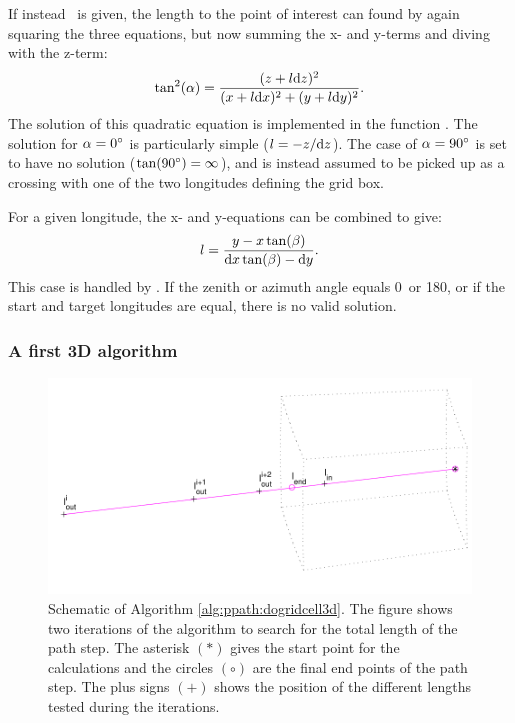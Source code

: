 If instead \Lat\ is given, the length to the point of interest can found by
again squaring the three equations, but now summing the x- and y-terms
and diving with the z-term:
\begin{equation}
  \tan^2(\alpha) = \frac{(z+l\mathrm{d} z)^2}{(x+l\mathrm{d} x)^2+(y+l\mathrm{d} y)^2}.
\end{equation}
The solution of this quadratic equation is implemented in the function
. The solution for $\alpha=0^\circ$ is particularly
simple ($l=-z/\mathrm{d} z$). The case of $\alpha=90^\circ$ is set to have no
solution ($\tan(90^\circ)=\infty$), and is instead assumed to be picked up as
a crossing with one of the two longitudes defining the grid box.

For a given longitude, the x- and y-equations can be combined to give:
\begin{equation}
  l = \frac{y-x\tan(\beta)}{\mathrm{d} x\tan(\beta)-\mathrm{d} y}.
\end{equation}
This case is handled by . If the zenith or azimuth
angle equals 0\degree\ or 180\degree, or if the start and target longitudes are
equal, there is no valid solution.



\subsubsection{A first 3D algorithm}
\label{sec:ppath:3dgeom}

\begin{figure}
 \begin{center}
  \includegraphics*[width=0.80\hsize]{ppath_3Dsearch}
  \caption{Schematic of Algorithm \ref{alg:ppath:dogridcell3d}. The
    figure shows two iterations of the algorithm to search for the
    total length of the path step. The asterisk $(\ast)$ gives the
    start point for the calculations and the circles $(\circ)$ are the
    final end points of the path step. The plus signs $(+)$ shows the
    position of the different lengths tested during the iterations.}
  \label{fig:ppath:3Dsearch}  
 \end{center}
\end{figure}

